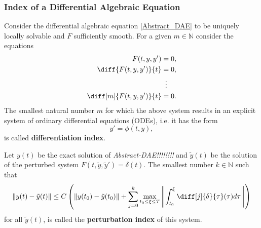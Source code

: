 	
	
	\subsubsection{Index of a Differential Algebraic Equation}
	
	\begin{frame}
		\begin{definition}%
			Consider the differential algebraic equation \eqref{Abstract_DAE} to be uniquely locally solvable and $F$ sufficiently smooth. For a given $m \in \mathbb{N}$ consider the equations
			\begin{displaymath}
				\begin{aligned}
					F(t,y,y') &= 0, \\
					\diff{F(t,y,y')}{t} &= 0, \\
					&\vdotswithin{=} \\
					\diff[m]{F(t,y,y')}{t} &= 0.
				\end{aligned}
			\end{displaymath}
			The smallest natural number $m$ for which the above system results in an explicit system of ordinary differential equations (ODEs), i.e. it has the form
			\begin{displaymath}
				y' = \phi(t,y),
			\end{displaymath}
			is called \textbf{differentiation index}.
		\end{definition}
	\end{frame}

	\begin{frame}
		\begin{definition}%
			Let $y(t)$ be the exact solution of \emph{Abstract-DAE!!!!!!!!} and $\tilde{y}(t)$ be the solution of the perturbed system $F(t, \tilde{y}, \tilde{y}') = \delta(t)$. The smallest number $k \in \mathbb{N}$ such that 
			\begin{displaymath}
				\|y(t)-\tilde{y}(t)\| \leq C \left(\|y(t_0)-\tilde{y}(t_0)\|+\sum_{j=0}^{k}\max_{t_0 \leq \xi \leq T} \left\rVert 		\int_{t_0}^{\xi}\diff[j]{\delta}{\tau}(\tau)d \tau \right\rVert \right)
			\end{displaymath}
			for all $\tilde{y}(t)$, is called the \textbf{perturbation index} of this system.
		\end{definition}
	\end{frame}

